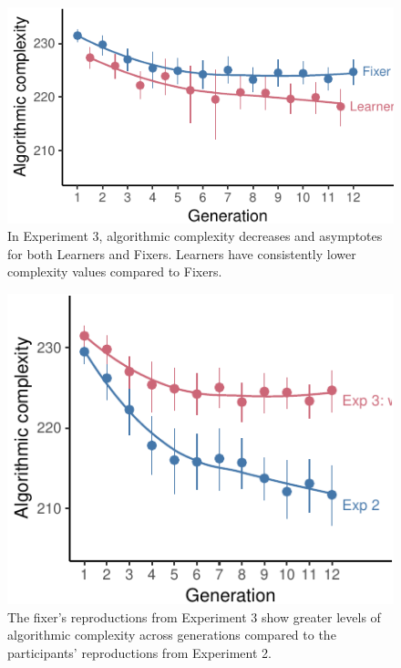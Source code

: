 \documentclass[10pt, letterpaper]{article}
\newenvironment{CodeChunk}{}{}
\begin{document}
\begin{CodeChunk}
\begin{figure}[tb]

{\centering \includegraphics{figs/e3_complexity_condition-1} 

}

\caption[In Experiment 3, algorithmic complexity decreases and asymptotes for both Learners and Fixers]{In Experiment 3, algorithmic complexity decreases and asymptotes for both Learners and Fixers. Learners have consistently lower complexity values compared to Fixers.}\label{fig:e3_complexity_condition}
\end{figure}
\end{CodeChunk}

\begin{CodeChunk}
\begin{figure}[tb]

{\centering \includegraphics{figs/both_complexity-1} 

}

\caption[The fixer's reproductions from Experiment 3 show greater levels of algorithmic complexity across generations compared to the participants' reproductions from Experiment 2]{The fixer's reproductions from Experiment 3 show greater levels of algorithmic complexity across generations compared to the participants' reproductions from Experiment 2.}\label{fig:both_complexity}
\end{figure}
\end{CodeChunk}
\end{document}

